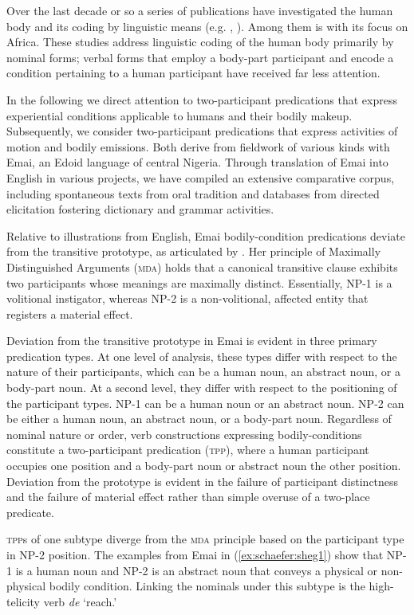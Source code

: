 \documentclass[output=paper,colorlinks,citecolor=brown
]{langscibook}
\begin{document}
Over the last decade or so a series of publications have investigated the human body and its coding by linguistic means (e.g. \cite{Ruthrof2015}, \cite{ZariquleyValenzuela2022}). Among them is \citet{BrenzingerKraskaSzlenk2014} with its focus on Africa. These studies address linguistic coding of the human body primarily by nominal forms; verbal forms that employ a body-part participant and encode a condition pertaining to a human participant have received far less attention.  

In the following we direct attention to two-participant predications that express experiential conditions applicable to humans and their bodily makeup. Subsequently, we consider two-participant predications that express activities of motion and bodily emissions. Both derive from fieldwork of various kinds with Emai, an Edoid language of central Nigeria. Through translation of Emai into English in various projects, we have compiled an extensive comparative corpus, including spontaneous texts from oral tradition and databases from directed elicitation fostering dictionary and grammar activities. 

Relative to illustrations from English, Emai bodily-condition predications deviate from the transitive prototype, as articulated by \citet{Naess2007}. Her principle of Maximally Distinguished Arguments (\textsc{mda}) holds that a canonical transitive clause exhibits two participants whose meanings are maximally distinct. Essentially, NP-1 is a volitional instigator, whereas NP-2 is a non-volitional, affected entity that registers a material effect. 

Deviation from the transitive prototype in Emai is evident in three primary predication types. At one level of analysis, these types differ with respect to the nature of their participants, which can be a human noun, an abstract noun, or a body-part noun. At a second level, they differ with respect to the positioning of the participant types. NP-1 can be a human noun or an abstract noun. NP-2 can be either a human noun, an abstract noun, or a body-part noun. Regardless of nominal nature or order, verb constructions expressing bodily-conditions constitute a two-participant predication (\textsc{tpp}), where a human participant occupies one position and a body-part noun or abstract noun the other position. Deviation from the prototype is evident in the failure of participant distinctness and the failure of material effect rather than simple overuse of a two-place predicate. 

 \textsc{tpp}s of one subtype diverge from the \textsc{mda} principle based on the participant type in NP-2 position. The examples from Emai in (\ref{ex:schaefer:sheg1}) show that NP-1 is a human noun and NP-2 is an abstract noun that conveys a physical or non-physical bodily condition. Linking the nominals under this subtype is the high-telicity verb \textit{de} ‘reach.’ 
\end{document}
